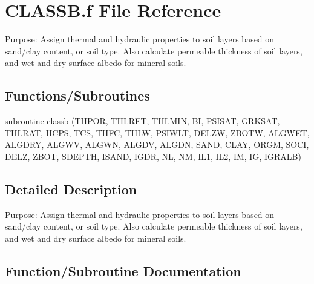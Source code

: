 \hypertarget{CLASSB_8f}{}\section{C\+L\+A\+S\+S\+B.\+f File Reference}
\label{CLASSB_8f}


Purpose\+: Assign thermal and hydraulic properties to soil layers based on sand/clay content, or soil type. Also calculate permeable thickness of soil layers, and wet and dry surface albedo for mineral soils.  


\subsection*{Functions/\+Subroutines}
\begin{DoxyCompactItemize}
\item 
subroutine \hyperlink{CLASSB_8f_ad124fb79b047c72316aea3d64d4721ee}{classb} (T\+H\+P\+O\+R, T\+H\+L\+R\+E\+T, T\+H\+L\+M\+I\+N, B\+I, P\+S\+I\+S\+A\+T, G\+R\+K\+S\+A\+T, T\+H\+L\+R\+A\+T, H\+C\+P\+S, T\+C\+S, T\+H\+F\+C, T\+H\+L\+W, P\+S\+I\+W\+L\+T, D\+E\+L\+Z\+W, Z\+B\+O\+T\+W, A\+L\+G\+W\+E\+T, A\+L\+G\+D\+R\+Y, A\+L\+G\+W\+V, A\+L\+G\+W\+N, A\+L\+G\+D\+V, A\+L\+G\+D\+N, S\+A\+N\+D, C\+L\+A\+Y, O\+R\+G\+M, S\+O\+C\+I, D\+E\+L\+Z, Z\+B\+O\+T, S\+D\+E\+P\+T\+H, I\+S\+A\+N\+D, I\+G\+D\+R, N\+L, N\+M, I\+L1, I\+L2, I\+M, I\+G, I\+G\+R\+A\+L\+B)
\end{DoxyCompactItemize}


\subsection{Detailed Description}
Purpose\+: Assign thermal and hydraulic properties to soil layers based on sand/clay content, or soil type. Also calculate permeable thickness of soil layers, and wet and dry surface albedo for mineral soils. 



\subsection{Function/\+Subroutine Documentation}
\hypertarget{CLASSB_8f_ad124fb79b047c72316aea3d64d4721ee}{}
